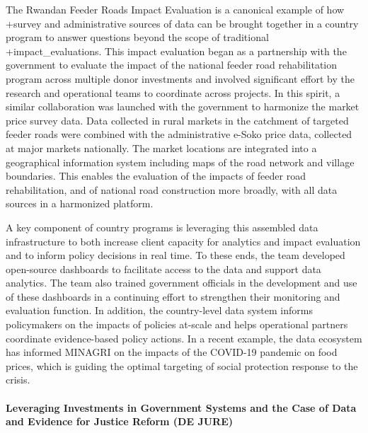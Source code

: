 \documentclass[
]{WileySix}
\begin{document}
The Rwandan Feeder Roads Impact Evaluation is a canonical example of how +survey\textbar{} and administrative sources of data can be brought together in a country program to answer questions beyond the scope of traditional +impact\_evaluations\textbar. This impact evaluation began as a partnership with the government to evaluate the impact of the national feeder road rehabilitation program across multiple donor investments and involved significant effort by the research and operational teams to coordinate across projects. In this spirit, a similar collaboration was launched with the government to harmonize the market price survey data. Data collected in rural markets in the catchment of targeted feeder roads were combined with the administrative e-Soko price data, collected at major markets nationally. The market locations are integrated into a geographical information system including maps of the road network and village boundaries. This enables the evaluation of the impacts of feeder road rehabilitation, and of national road construction more broadly, with all data sources in a harmonized platform.

A key component of country programs is leveraging this assembled data infrastructure to both increase client capacity for analytics and impact evaluation and to inform policy decisions in real time. To these ends, the team developed open-source dashboards to facilitate access to the data and support data analytics. The team also trained government officials in the development and use of these dashboards in a continuing effort to strengthen their monitoring and evaluation function. In addition, the country-level data system informs policymakers on the impacts of policies at-scale and helps operational partners coordinate evidence-based policy actions. In a recent example, the data ecosystem has informed MINAGRI on the impacts of the COVID-19 pandemic on food prices, which is guiding the optimal targeting of social protection response to the crisis.

\hypertarget{leveraging-investments-in-government-systems-and-the-case-of-data-and-evidence-for-justice-reform-de-jure}{%
\paragraph{Leveraging Investments in Government Systems and the Case of Data and Evidence for Justice Reform (DE JURE)}\label{leveraging-investments-in-government-systems-and-the-case-of-data-and-evidence-for-justice-reform-de-jure}}
\end{document}
